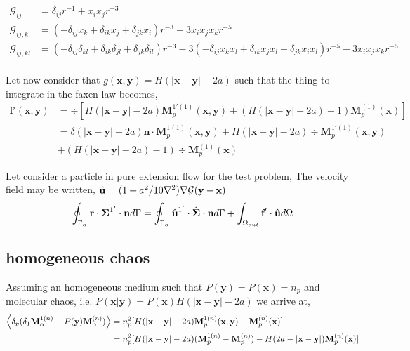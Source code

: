 \documentclass[12pt]{My_preprint}
\begin{document}
\begin{align*}
    \mathcal{G}_{ij} &= \delta_{ij} r^{-1} + x_ix_j r^{-3}\\
    \mathcal{G}_{ij,k} &= 
    (- \delta_{ij}x_k + \delta_{ik} x_j+ \delta_{jk} x_i) r^{-3}  
    - 3 x_ix_jx_k r^{-5}\\
    \mathcal{G}_{ij,kl} &= 
    (- \delta_{ij}\delta_{kl} + \delta_{ik} \delta_{jl}+ \delta_{jk} \delta_{il}) r^{-3}  
    -3 (- \delta_{ij}x_kx_l + \delta_{ik} x_jx_l+ \delta_{jk} x_ix_l) r^{-5}  
    - 3 x_ix_jx_k r^{-5}\\
\end{align*}

Let now consider that $g(\textbf{x},\textbf{y}) = H(|\textbf{x} - \textbf{y}| - 2a)$ such that the thing to integrate in the faxen law becomes, 
\begin{align}
    \textbf{f}'(\textbf{x},\textbf{y})
    &=
    \div [ H(|\textbf{x} - \textbf{y}| - 2a)\textbf{M}_{p}^{1'(1)}(\textbf{x},\textbf{y}) 
    + (H(|\textbf{x} - \textbf{y}|-2a)-1)\textbf{M}_{p}^{(1)}(\textbf{x})]\\
    &=
    \delta(|\textbf{x} - \textbf{y}| - 2a)\textbf{n}\cdot 
    \textbf{M}_{p}^{1(1)}(\textbf{x},\textbf{y}) 
    +  H(|\textbf{x} - \textbf{y}| - 2a) 
    \div \textbf{M}_{p}^{1'(1)}(\textbf{x},\textbf{y}) \\
    &+(H(|\textbf{x} - \textbf{y}|-2a)-1) \div \textbf{M}_{p}^{(1)}(\textbf{x}) 
\end{align}

Let consider a particle in pure extension flow for the test problem,
The velocity field may be written, $\hat{\textbf{u}} = (1 + a^2/10\grad^2)\grad\mathcal{G}(\textbf{y}-\textbf{x})$
\begin{equation}
    \intS{\textbf{r}\cdot \bm\Sigma^{1'}\cdot \textbf{n}}
    =
    \intS{\hat{\textbf{u}}^{1'}\cdot \hat{\bm\Sigma}\cdot \textbf{n}}
    + \intO[out]{\textbf{f}' \cdot \hat{\textbf{u}}} 
\end{equation}




\subsection*{homogeneous chaos }
Assuming an homogeneous medium such that $P(\textbf{y}) = P(\textbf{x}) = n_p$ and molecular chaos, i.e. $P(\textbf{x}|\textbf{y}) =P(\textbf{x}) H(|\textbf{x}-\textbf{y}|-2a)$ we arrive at,
\begin{align}
    \pavg{(\delta_1\textbf{M}_\alpha^{1(n)} - P(\textbf{y})\textbf{M}_\alpha^{(n)})}
    &=
    n_p^2 [H(|\textbf{x}-\textbf{y}|-2a) \textbf{M}_{p}^{1(n)}(\textbf{x},\textbf{y})
    -\textbf{M}_{p}^{(n)}(\textbf{x})]\\
    &=
    n_p^2 [H(|\textbf{x}-\textbf{y}|-2a) (\textbf{M}_{p}^{1(n)} - \textbf{M}_{p}^{(n)})
    -H(2a - |\textbf{x}-\textbf{y}|) \textbf{M}_{p}^{(n)}(\textbf{x})]
\end{align}
\end{document}
